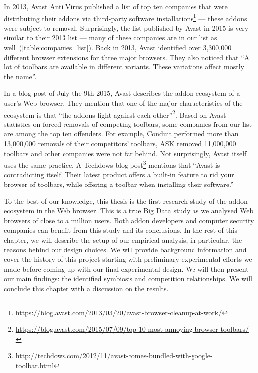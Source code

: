 \documentclass[11pt,oneside]{book}
\begin{document}
In 2013, Avast Anti Virus published a list of top ten companies that were distributing their addons via third-party software installations\footnote{\url{https://blog.avast.com/2013/03/20/avast-browser-cleanup-at-work/}} --- these addons were subject to removal. Surprisingly, the list published by Avast in 2015 is very similar to their 2013 list --- many of these companies are in our list as well~(\autoref{table:companies_list}). Back in 2013, Avast identified over 3,300,000 different browser extensions for three major browsers. They also noticed that ``A lot of toolbars are available in different variants. These variations affect mostly the name''. 

In a blog post of July the 9th 2015, Avast describes the addon ecosystem of a user's Web browser. They mention that one of the major characteristics of the ecosystem is that ``the addons fight against each other''\footnote{\url{https://blog.avast.com/2015/07/09/top-10-most-annoying-browser-toolbars/}}.
Based on Avast statistics on forced removals of competing toolbars, some companies from our list are among the top ten offenders. For example, Conduit performed more than 13,000,000 removals of their competitors' toolbars, ASK removed 11,000,000 toolbars and other companies were not far behind. Not surprisingly, Avast itself uses the same practice. A Techdows blog post\footnote{\url{http://techdows.com/2012/11/avast-comes-bundled-with-google-toolbar.html}} mentions that ``Avast is contradicting itself. Their latest product offers a built-in feature to rid your browser of toolbars, while offering a toolbar when installing their software.''

To the best of our knowledge, this thesis is the first research study of the addon ecosystem in the Web browser. This is a true Big Data study as we analysed Web browsers of close to a million users. Both addon developers and computer security companies can benefit from this study and its conclusions. In the rest of this chapter, we will describe the setup of our empirical analysis, in particular, the reasons behind our design choices. We will provide background information and cover the history of this project starting with preliminary experimental efforts we made before coming up with our final experimental design. We will then present our main findings: the identified symbiosis and competition relationships. We will conclude this chapter with a discussion on the results.
\end{document}
